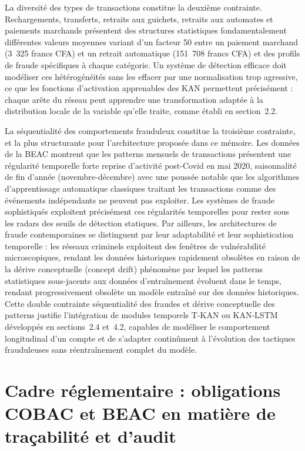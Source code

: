 \documentclass[11pt,a4paper,oneside]{report}
\theoremstyle{definition}
\theoremstyle{remark}
\begin{document}
La diversité des types de transactions constitue la deuxième contrainte. Rechargements, transferts, retraits aux guichets, retraits aux automates et paiements marchands présentent des structures statistiques fondamentalement différentes  valeurs moyennes variant d'un facteur 50 entre un paiement marchand (3~325 francs CFA) et un retrait automatique (151~708 francs CFA)  et des profils de fraude spécifiques à chaque catégorie. Un système de détection efficace doit modéliser ces hétérogénéités sans les effacer par une normalisation trop agressive, ce que les fonctions d'activation apprenables des KAN permettent précisément : chaque arête du réseau peut apprendre une transformation adaptée à la distribution locale de la variable qu'elle traite, comme établi en section~2.2.

La séquentialité des comportements frauduleux constitue la troisième contrainte, et la plus structurante pour l'architecture proposée dans ce mémoire. Les données de la BEAC montrent que les patterns mensuels de transactions présentent une régularité temporelle forte  reprise d'activité post-Covid en mai 2020, saisonnalité de fin d'année (novembre-décembre) avec une poussée notable  que les algorithmes d'apprentissage automatique classiques traitant les transactions comme des événements indépendants ne peuvent pas exploiter. Les systèmes de fraude sophistiqués exploitent précisément ces régularités temporelles pour rester sous les radars des seuils de détection statiques. Par ailleurs, les architectures de fraude contemporaines se distinguent par leur adaptabilité et leur sophistication temporelle : les réseaux criminels exploitent des fenêtres de vulnérabilité microscopiques, rendant les données historiques rapidement obsolètes en raison de la dérive conceptuelle (concept drift)  phénomène par lequel les patterns statistiques sous-jacents aux données d'entraînement évoluent dans le temps, rendant progressivement obsolète un modèle entraîné sur des données historiques. Cette double contrainte  séquentialité des fraudes et dérive conceptuelle des patterns  justifie l'intégration de modules temporels T-KAN ou KAN-LSTM développés en sections~2.4 et~4.2, capables de modéliser le comportement longitudinal d'un compte et de s'adapter continûment à l'évolution des tactiques frauduleuses sans réentraînement complet du modèle.

\section{Cadre réglementaire : obligations COBAC et BEAC en matière de traçabilité et d'audit}
\end{document}
